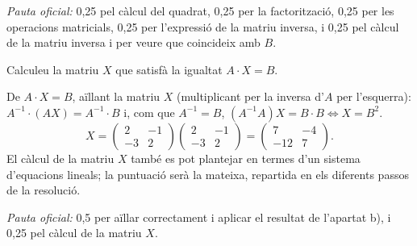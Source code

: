 \begin{apartats}
\begin{solucio}
\textit{Pauta oficial:} 0,25 pel càlcul del quadrat, 0,25 per la factorització, 0,25 per les operacions
matricials, 0,25 per l'expressió de la matriu inversa, i 0,25 pel càlcul de la matriu inversa i per veure que
coincideix amb $B$.
\end{solucio}

Calculeu la matriu $X$ que satisfà la igualtat $A\cdot X=B$.

\begin{solucio}
De $A\cdot X=B$, aïllant la matriu $X$ (multiplicant per la inversa d'$A$ per l'esquerra):
$A^{-1}\cdot(AX)=A^{-1}\cdot B$ i, com que $A^{-1}=B$, $\left(A^{-1}A\right)X=B\cdot B\iff\boxed{X=B^2}$.
\[
X=\begin{pmatrix}2&-1\\-3&2\end{pmatrix}\begin{pmatrix}2&-1\\-3&2\end{pmatrix}=\boxed{\begin{pmatrix}7&-4\\-12&7\end{pmatrix}}.
\]
El càlcul de la matriu $X$ també es pot plantejar en termes d'un sistema d'equacions lineals; la puntuació serà
la mateixa, repartida en els diferents passos de la resolució.

\textit{Pauta oficial:} 0,5 per aïllar correctament i aplicar el resultat de l'apartat b), i 0,25 pel càlcul de la
matriu $X$.
\end{solucio}

\end{apartats}
